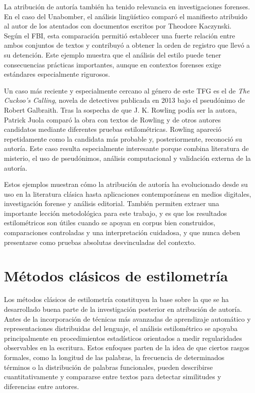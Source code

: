 \documentclass[IB]{TFUOC}%
\begin{document}
La atribución de autoría también ha tenido relevancia en investigaciones forenses. En el caso del Unabomber, el análisis lingüístico comparó el manifiesto atribuido al autor de los atentados con documentos escritos por Theodore Kaczynski. Según el FBI, esta comparación permitió establecer una fuerte relación entre ambos conjuntos de textos y contribuyó a obtener la orden de registro que llevó a su detención\cite{fbi_unabomber}. Este ejemplo muestra que el análisis del estilo puede tener consecuencias prácticas importantes, aunque en contextos forenses exige estándares especialmente rigurosos.

Un caso más reciente y especialmente cercano al género de este TFG es el de \textit{The Cuckoo's Calling}, novela de detectives publicada en 2013 bajo el pseudónimo de Robert Galbraith. Tras la sospecha de que J. K. Rowling podía ser la autora, Patrick Juola comparó la obra con textos de Rowling y de otros autores candidatos mediante diferentes pruebas estilométricas. Rowling apareció repetidamente como la candidata más probable y, posteriormente, reconoció su autoría\cite{juola2015rowling}. Este caso resulta especialmente interesante porque combina literatura de misterio, el uso de pseudónimos, análisis computacional y validación externa de la autoría.

Estos ejemplos muestran cómo la atribución de autoría ha evolucionado desde su uso en la literatura clásica hasta aplicaciones contemporáneas en medios digitales, investigación forense y análisis editorial. También permiten extraer una importante lección metodológica para este trabajo, y es que los resultados estilométricos son útiles cuando se apoyan en corpus bien construidos, comparaciones controladas y una interpretación cuidadosa, y que nunca deben presentarse como pruebas absolutas desvinculadas del contexto.

\section{Métodos clásicos de estilometría}

Los métodos clásicos de estilometría constituyen la base sobre la que se ha desarrollado buena parte de la investigación posterior en atribución de autoría. Antes de la incorporación de técnicas más avanzadas de aprendizaje automático y representaciones distribuidas del lenguaje, el análisis estilométrico se apoyaba principalmente en procedimientos estadísticos orientados a medir regularidades observables en la escritura. Estos enfoques parten de la idea de que ciertos rasgos formales, como la longitud de las palabras, la frecuencia de determinados términos o la distribución de palabras funcionales, pueden describirse cuantitativamente y compararse entre textos para detectar similitudes y diferencias entre autores.
\end{document}

